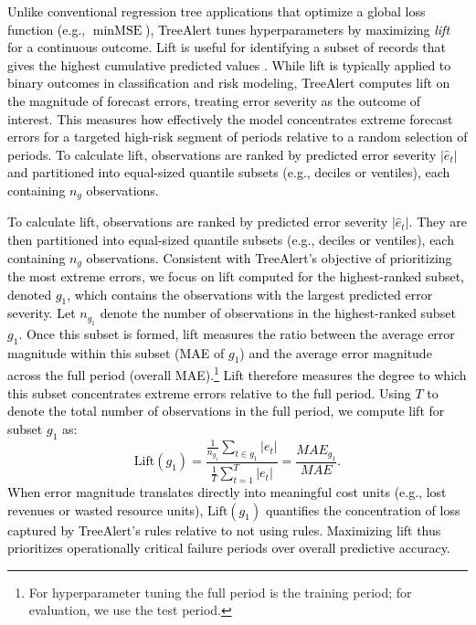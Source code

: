 \documentclass[]{interact}
\newcommand{\matt}[1]{\textcolor{black}{#1}}
\theoremstyle{plain}
\theoremstyle{definition}
\theoremstyle{remark}
\begin{document}
\matt{Unlike conventional regression tree applications that optimize a global loss function (e.g., $\min \text{MSE}$), TreeAlert tunes hyperparameters by maximizing \emph{lift} for a continuous outcome. Lift is useful for identifying a subset of records that gives the highest cumulative predicted values \citep{shmueli2024machine}. While lift is typically applied to binary outcomes in classification and risk modeling, TreeAlert computes lift on the magnitude of forecast errors, treating error severity as the outcome of interest. This measures how effectively the model concentrates extreme forecast errors for a targeted high-risk segment of periods relative to a random selection of periods. To calculate lift, observations are ranked by predicted error severity $|\hat{e}_t|$ and partitioned into equal-sized quantile subsets (e.g., deciles or ventiles), each containing \( n_g \) observations. }

\matt{To calculate lift, observations are ranked by predicted error severity $|\hat{e}_t|$. They are then partitioned into equal-sized quantile subsets (e.g., deciles or ventiles), each containing \( n_g \) observations. Consistent with TreeAlert's objective of prioritizing the most extreme errors, we focus on lift computed for the highest-ranked subset, denoted \( g_{1} \), which contains the observations with the largest predicted error severity. Let \( n_{g_1} \) denote the number of observations in the highest-ranked subset \( g_{1} \). Once this subset is formed, lift measures the ratio between the average error magnitude within this subset (MAE of $g_1$) and the average  error magnitude across the full period (overall MAE).\footnote{For hyperparameter tuning the full period is the training period; for evaluation, we use the test period.} Lift therefore measures the degree to which this subset concentrates extreme errors relative to the full period. Using \( T \) to denote the total number of observations in the full period, we compute lift for subset \( g_{1} \) as:
\begin{equation}
\text{Lift}(g_{1}) =
\frac{
\displaystyle \frac{1}{n_{g_1}}\sum_{t\in {g_1}} |e_t|
}{
\displaystyle \frac{1}{T}\sum_{t=1}^{T} |e_t|
} = \frac{MAE_{g_1}}{MAE}.
\end{equation}
When error magnitude translates directly into meaningful cost units (e.g., lost revenues or wasted resource units), $\text{Lift}(g_1)$ quantifies the concentration of loss captured by TreeAlert's rules relative to not using rules. Maximizing lift thus prioritizes operationally critical failure periods over overall predictive
accuracy.}
\end{document}
